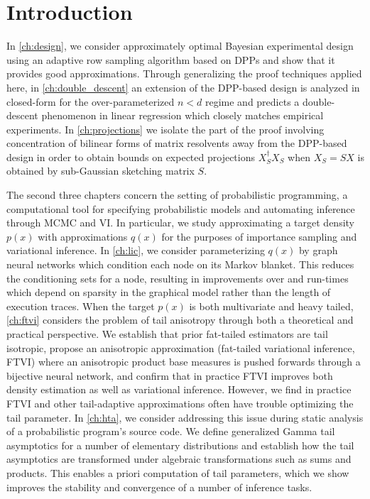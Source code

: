 \chapter{Introduction}

In \cref{ch:design}, we consider approximately optimal Bayesian experimental design
using an adaptive row sampling algorithm based on DPPs and show that it provides
good approximations. Through generalizing the proof techniques 
applied here, in \cref{ch:double_descent} an extension of the DPP-based design is analyzed in
closed-form for the over-parameterized $n < d$ regime and predicts a double-descent phenomenon in
linear regression which closely matches empirical experiments.
In \cref{ch:projections} we isolate the part of the proof involving concentration
of bilinear forms of matrix resolvents away from the DPP-based design in order to obtain bounds on
expected projections $X_S^\dag X_S$ when $X_S = S X$ is obtained by sub-Gaussian sketching matrix $S$.

The second three chapters concern the setting of probabilistic programming, a computational tool
for specifying probabilistic models and automating inference through MCMC and VI. In particular, we
study approximating a target density $p(x)$ with approximations $q(x)$ for the purposes of
importance sampling and variational inference.
In \cref{ch:lic}, we consider parameterizing $q(x)$ by graph neural networks which condition each
node on its Markov blanket. This reduces the conditioning sets for a node, resulting in improvements over
\cite{le2017inference} and run-times which depend on sparsity in the graphical model rather than
the length of execution traces.
When the target $p(x)$ is both multivariate and heavy tailed, \cref{ch:ftvi}
considers the problem of tail anisotropy through both a theoretical and practical perspective.
We establish that prior fat-tailed estimators \citep{jaini2020tails} are tail isotropic, propose
an anisotropic approximation (fat-tailed variational inference, FTVI) where
an anisotropic product base measures is pushed forwards through a bijective neural network,
and confirm that in practice FTVI improves both density estimation as well as variational inference.
However, we find in practice FTVI and other tail-adaptive approximations often have trouble optimizing
the tail parameter. In \cref{ch:hta}, we consider addressing this issue during static analysis of a
probabilistic program's source code. We define generalized Gamma tail asymptotics for a number of
elementary distributions and establish how the tail asymptotics are transformed under algebraic transformations
such as sums and products. This enables a priori computation of tail parameters, which we show
improves the stability and convergence of a number of inference tasks.